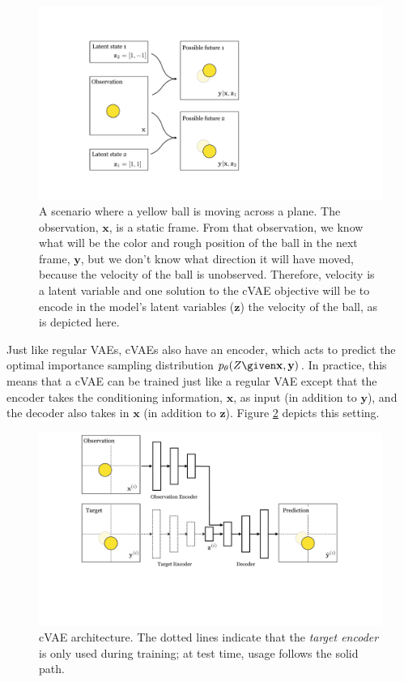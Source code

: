 \begin{figure}[h!]
    \centerline{
    \includegraphics[width=0.6\linewidth]{./figures/conditional_generative_models/cVAE_ball_bouncing_example.pdf}
    }
    \caption{A scenario where a yellow ball is moving across a plane. The observation, $\mathbf{x}$, is a static frame. From that observation, we know what will be the color and rough position of the ball in the next frame, $\mathbf{y}$, but we don't know what direction it will have moved, because the velocity of the ball is unobserved. Therefore, velocity is a latent variable and one solution to the cVAE objective will be to encode in the model's latent variables ($\mathbf{z}$) the velocity of the ball, as is depicted here.}
    \label{fig:conditional_generative_models:cVAE_ball_bouncing_example}
\end{figure}

Just like regular VAEs, cVAEs also have an encoder, which acts to predict the optimal importance sampling distribution $p_{\theta}(Z \given \mathbf{x}, \mathbf{y})$. In practice, this means that a cVAE can be trained just like a regular VAE except that the encoder takes the conditioning information, $\mathbf{x}$, as input (in addition to $\mathbf{y}$), and the decoder also takes in $\mathbf{x}$ (in addition to $\mathbf{z}$). Figure \ref{fig:conditional_generative_models:cVAE_ball_bouncing_example_nets} depicts this setting.  
\begin{figure}[h!]
    \centerline{
    \includegraphics[width=0.9\linewidth]{./figures/conditional_generative_models/cVAE_ball_bouncing_example_nets.pdf}
    }
    \caption{cVAE architecture. The dotted lines indicate that the \textit{target encoder} is only used during training; at test time, usage follows the solid path.}
    \label{fig:conditional_generative_models:cVAE_ball_bouncing_example_nets}
\end{figure}

